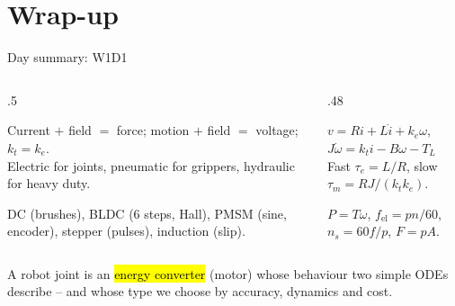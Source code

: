 \documentclass[aspectratio=169,10pt]{beamer}
\begin{document}
\section*{Wrap-up}
\begin{frame}{Day summary: W1D1}
\begin{columns}[T]
\begin{column}{.5\textwidth}
\small
\begin{defbox}
Current $+$ field $=$ force; motion $+$ field $=$ voltage; $k_t=k_e$.\\
Electric for joints, pneumatic for grippers, hydraulic for heavy duty.
\end{defbox}
\begin{defbox}
DC (brushes), BLDC (6 steps, Hall), PMSM (sine, encoder), stepper (pulses), induction (slip).
\end{defbox}
\end{column}
\begin{column}{.48\textwidth}
\small
\begin{defbox}
$v=Ri+L\dot i+k_e\omega$, \; $J\dot\omega=k_ti-B\omega-T_L$\\
Fast $\tau_e=L/R$, slow $\tau_m=RJ/(k_tk_e)$.
\end{defbox}
\begin{defbox}
$P=T\omega$, \; $f_\text{el}=pn/60$, \; $n_s=60f/p$, \; $F=pA$.
\end{defbox}
\end{column}
\end{columns}
\vspace{2mm}
\begin{keybox}
\small
A robot joint is an \hl{energy converter} (motor) whose behaviour two simple ODEs describe -- and whose type we choose by accuracy, dynamics and cost.
\end{keybox}
\end{frame}
\end{document}
